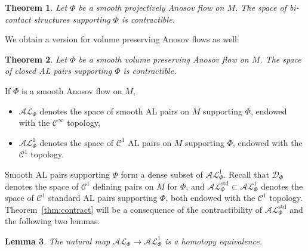 \documentclass[letterpaper, 11pt]{article}
\numberwithin{equation}{section}
\newtheorem{thm}{Theorem}[section]
\newtheorem{lem}[thm]{Lemma}
\begin{document}
\begin{thm} \label{thm:projcontract} Let $\Phi$ be a smooth projectively Anosov flow on $M$. The space of bi-contact structures supporting $\Phi$ is contractible.
\end{thm}

We obtain a version for volume preserving Anosov flows as well:

\begin{thm} \label{thm:volcontract}
Let $\Phi$ be a smooth volume preserving Anosov flow on $M$. The space of closed AL pairs supporting $\Phi$ is contractible.
\end{thm}

If $\Phi$ is a smooth Anosov flow on $M$,
\begin{itemize}
\item $\mathcal{AL}_\Phi$ denotes the space of smooth AL pairs on $M$ supporting $\Phi$, endowed with the $\mathcal{C}^\infty$ topology,
\item $\mathcal{AL}^1_\Phi$ denotes the space of $\mathcal{C}^1$ AL pairs on $M$ supporting $\Phi$, endowed with the $\mathcal{C}^1$ topology.
\end{itemize}
Smooth AL pairs supporting $\Phi$ form a dense subset of $\mathcal{AL}^1_\Phi$. Recall that  $\mathcal{D}_\Phi$ denotes the space of $\mathcal{C}^1$ defining pairs on $M$ for $\Phi$, and $\mathcal{AL}^{\mathrm{std}}_\Phi \subset \mathcal{AL}^1_\Phi$ denotes the space of $\mathcal{C}^1$ standard AL pairs supporting $\Phi$, both endowed with the $\mathcal{C}^1$ topology. Theorem~\ref{thm:contract} will be a consequence of the contractibility of $\mathcal{AL}^{\mathrm{std}}_\Phi $ and the following two lemmas.

\begin{lem} \label{lem:heq}
The natural map $\mathcal{AL}_\Phi \rightarrow \mathcal{AL}^1_\Phi$ is a homotopy equivalence.
\end{lem}
\end{document}
